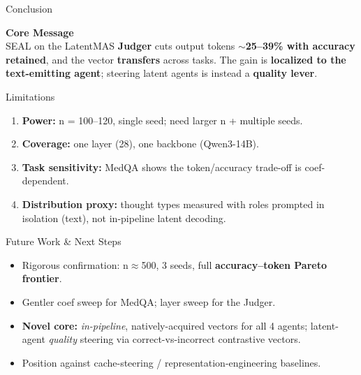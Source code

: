 \documentclass{beamer}
\begin{document}
\begin{frame}{Conclusion}
    \begin{center}
        \Large \textbf{Core Message} \\
        \vspace{0.6cm}
        \normalsize SEAL on the LatentMAS \textbf{Judger} cuts output tokens \textbf{$\sim$25--39\% with accuracy retained}, and the vector \textbf{transfers} across tasks. The gain is \textbf{localized to the text-emitting agent}; steering latent agents is instead a \textbf{quality lever}.
    \end{center}
\end{frame}

\begin{frame}{Limitations}
    \begin{enumerate}
        \item \textbf{Power:} n = 100--120, single seed; need larger n + multiple seeds.
        \item \textbf{Coverage:} one layer (28), one backbone (Qwen3-14B).
        \item \textbf{Task sensitivity:} MedQA shows the token/accuracy trade-off is coef-dependent.
        \item \textbf{Distribution proxy:} thought types measured with roles prompted in isolation (text), not in-pipeline latent decoding.
    \end{enumerate}
\end{frame}

\begin{frame}{Future Work \& Next Steps}
    \begin{itemize}
        \item Rigorous confirmation: n$\approx$500, 3 seeds, full \textbf{accuracy--token Pareto frontier}.
        \item Gentler coef sweep for MedQA; layer sweep for the Judger.
        \item \textbf{Novel core:} \emph{in-pipeline}, natively-acquired vectors for all 4 agents; latent-agent \emph{quality} steering via correct-vs-incorrect contrastive vectors.
        \item Position against cache-steering / representation-engineering baselines.
    \end{itemize}
\end{frame}
\end{document}
